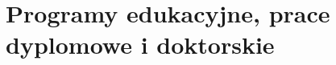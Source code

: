 \section{Programy edukacyjne, prace dyplomowe i doktorskie}
\label{sec:programy_edukacyjne_prace_dyplomowe_i_doktorskie}


